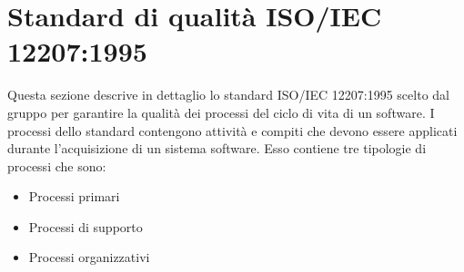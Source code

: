 \section{Standard di qualità ISO/IEC 12207:1995}
Questa sezione descrive in dettaglio lo standard ISO/IEC 12207:1995 scelto dal gruppo per garantire la qualità dei processi del ciclo di vita di un software. I processi dello standard contengono attività e compiti che devono essere applicati durante l'acquisizione di un sistema software. Esso contiene tre tipologie di processi che sono: 
\begin{itemize}
\item Processi primari
\item Processi di supporto
\item Processi organizzativi
\end{itemize}



